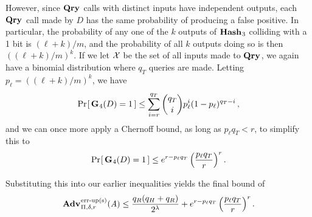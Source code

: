 However, since $\textup{\textbf{Qry}}\hspace{0.5pt}$ calls with distinct inputs have independent outputs, each $\textup{\textbf{Qry}}\hspace{0.5pt}$ call made by $D$ has the same probability of producing a false positive. In particular, the probability of any one of the $k$ outputs of $\textup{\textbf{Hash}}\hspace{0.5pt}_3$ colliding with a 1 bit is $(\ell+k)/m$, and the probability of all $k$ outputs doing so is then $((\ell+k)/m)^k$. If we let $\mathcal{X}$ be the set of all inputs made to $\textup{\textbf{Qry}}\hspace{0.5pt}$, we again have a binomial distribution where $q_T$ queries are made. Letting $p_\ell = ((\ell+k)/m)^k$, we have
\begin{equation}
   \Pr\hspace{-1pt}\left[\,\textup{\textbf{G}}\hspace{0.5pt}_4(D)=1\,\right] \le
     \sum_{i=r}^{q_T} \binom{q_T}{i}p_\ell^i(1-p_\ell)^{q_T-i} \,,
\end{equation}
and we can once more apply a Chernoff bound, as long as $p_\ell q_T < r$, to simplify this to
\begin{equation}
   \Pr\hspace{-1pt}\left[\,\textup{\textbf{G}}\hspace{0.5pt}_4(D)=1\,\right] \le
     e^{r-p_\ell q_T}\left(\frac{p_\ell q_T}{r}\right)^r.
\end{equation}

Substituting this into our earlier inequalities yields the final bound of
\begin{equation}
   \Adv{\erreps}_{\Pi,\delta,r}(\advA) \leq
     \frac{q_R(q_H+q_R)}{2^\lambda} + e^{r-p_\ell q_T}\left(\frac{p_\ell q_T}{r}\right)^r.
\end{equation}
